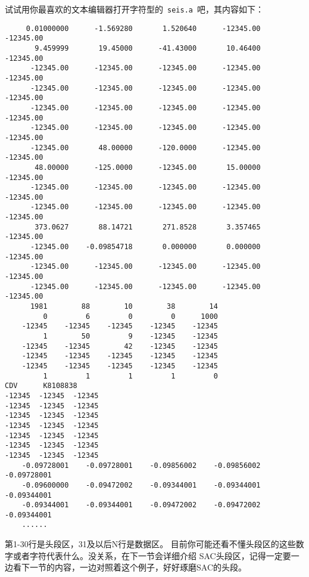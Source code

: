 试试用你最喜欢的文本编辑器打开字符型的~\verb+seis.a+~吧，其内容如下：
\begin{verbatim}
     0.01000000      -1.569280       1.520640      -12345.00      -12345.00
       9.459999       19.45000      -41.43000       10.46400      -12345.00
      -12345.00      -12345.00      -12345.00      -12345.00      -12345.00
      -12345.00      -12345.00      -12345.00      -12345.00      -12345.00
      -12345.00      -12345.00      -12345.00      -12345.00      -12345.00
      -12345.00      -12345.00      -12345.00      -12345.00      -12345.00
      -12345.00       48.00000      -120.0000      -12345.00      -12345.00
       48.00000      -125.0000      -12345.00       15.00000      -12345.00
      -12345.00      -12345.00      -12345.00      -12345.00      -12345.00
      -12345.00      -12345.00      -12345.00      -12345.00      -12345.00
       373.0627       88.14721       271.8528       3.357465      -12345.00
      -12345.00    -0.09854718       0.000000       0.000000      -12345.00
      -12345.00      -12345.00      -12345.00      -12345.00      -12345.00
      -12345.00      -12345.00      -12345.00      -12345.00      -12345.00
      1981        88        10        38        14  
         0         6         0         0      1000
    -12345    -12345    -12345    -12345    -12345
         1        50         9    -12345    -12345
    -12345    -12345        42    -12345    -12345
    -12345    -12345    -12345    -12345    -12345
    -12345    -12345    -12345    -12345    -12345
         1         1         1         1         0   
CDV      K8108838    
-12345  -12345  -12345  
-12345  -12345  -12345  
-12345  -12345  -12345  
-12345  -12345  -12345  
-12345  -12345  -12345  
-12345  -12345  -12345  
-12345  -12345  -12345  
    -0.09728001    -0.09728001    -0.09856002    -0.09856002    -0.09728001
    -0.09600000    -0.09472002    -0.09344001    -0.09344001    -0.09344001
    -0.09344001    -0.09344001    -0.09472002    -0.09472002    -0.09344001
    ......
\end{verbatim}

第1-30行是头段区，31及以后N行是数据区。
目前你可能还看不懂头段区的这些数字或者字符代表什么。没关系，在下一节会详细介绍
SAC头段区，记得一定要一边看下一节的内容，一边对照着这个例子，好好琢磨SAC的头段。
